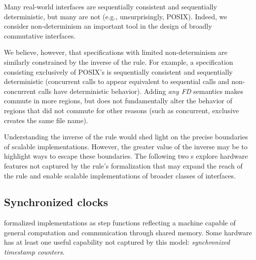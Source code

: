 Many real-world interfaces are sequentially consistent and
sequentially deterministic, but many are not (e.g., unsurprisingly,
POSIX).  Indeed, we consider non-determinism an important tool in the
design of broadly commutative interfaces.

We believe, however, that specifications with limited non-determinism
are similarly constrained by the inverse of the rule.
%
%
For example, a specification consisting exclusively of POSIX's
 is sequentially consistent and sequentially deterministic
(concurrent calls to  appear equivalent to sequential calls
and non-concurrent calls have deterministic behavior).
%
Adding \emph{any FD} semantics makes  commute in more
regions, but does not fundamentally alter the behavior of regions that
did not commute for other reasons (such as concurrent, exclusive
creates the same file name).

Understanding the inverse of the rule would shed light on the precise
boundaries of scalable implementations.
%
However, the greater value of the inverse may be to highlight ways to
escape these boundaries.  The following two
s explore hardware features not
captured by the rule's formalization that may expand the reach of the
rule and enable scalable implementations of broader classes of
interfaces.


\subsection{Synchronized clocks}
\label{sec:future-work:clocks}

 formalized implementations as step
functions reflecting a machine capable of general computation and
communication through shared memory.
%
Some hardware has at least one useful capability not captured by this
model: \emph{synchronized timestamp counters}.

%

